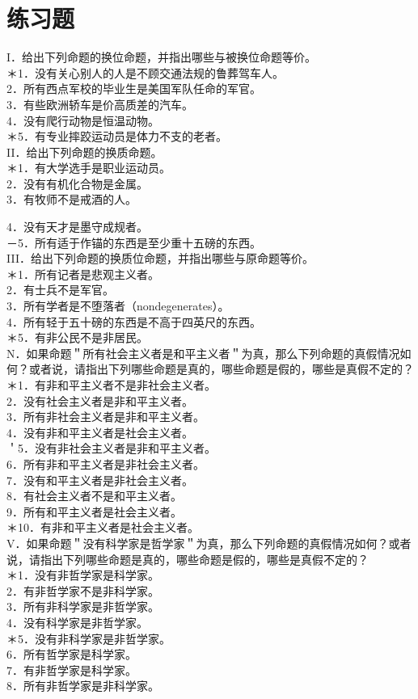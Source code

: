 \section*{练习题}
I．给出下列命题的换位命题，并指出哪些与被换位命题等价。\\
＊1．没有关心别人的人是不顾交通法规的鲁葬驾车人。\\
2．所有西点军校的毕业生是美国军队任命的军官。\\
3．有些欧洲轿车是价高质差的汽车。\\
4．没有爬行动物是恒温动物。\\
＊5．有专业摔跤运动员是体力不支的老者。\\
II．给出下列命题的换质命题。\\
＊1．有大学选手是职业运动员。\\
2．没有有机化合物是金属。\\
3．有牧师不是戒酒的人。

4．没有天才是墨守成规者。\\
－5．所有适于作锚的东西是至少重十五磅的东西。\\
III．给出下列命题的换质位命题，并指出哪些与原命题等价。\\
＊1．所有记者是悲观主义者。\\
2．有士兵不是军官。\\
3．所有学者是不堕落者（nondegenerates）。\\
4．所有轻于五十磅的东西是不高于四英尺的东西。\\
＊5．有非公民不是非居民。\\
N．如果命题＂所有社会主义者是和平主义者＂为真，那么下列命题的真假情况如何？或者说，请指出下列哪些命题是真的，哪些命题是假的，哪些是真假不定的？\\
＊1．有非和平主义者不是非社会主义者。\\
2．没有社会主义者是非和平主义者。\\
3．所有非社会主义者是非和平主义者。\\
4．没有非和平主义者是社会主义者。\\
＇5．没有非社会主义者是非和平主义者。\\
6．所有非和平主义者是非社会主义者。\\
7．没有和平主义者是非社会主义者。\\
8．有社会主义者不是和平主义者。\\
9．所有和平主义者是社会主义者。\\
＊10．有非和平主义者是社会主义者。\\
V．如果命题＂没有科学家是哲学家＂为真，那么下列命题的真假情况如何？或者说，请指出下列哪些命题是真的，哪些命题是假的，哪些是真假不定的？\\
＊1．没有非哲学家是科学家。\\
2．有非哲学家不是非科学家。\\
3．所有非科学家是非哲学家。\\
4．没有科学家是非哲学家。\\
＊5．没有非科学家是非哲学家。\\
6．所有哲学家是科学家。\\
7．有非哲学家是科学家。\\
8．所有非哲学家是非科学家。

